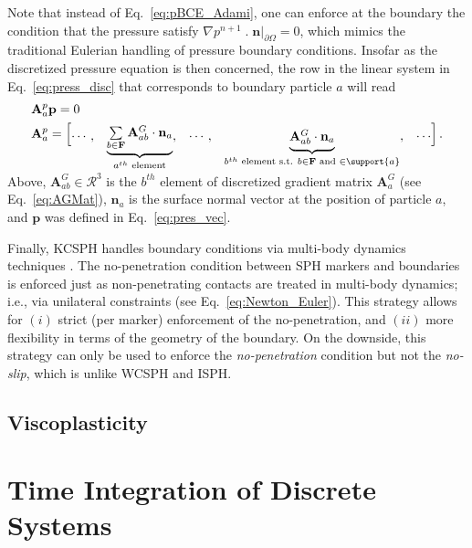 Note that instead of Eq.~\ref{eq:pBCE_Adami}, one can enforce at the boundary the condition that the pressure satisfy $\nabla p^{n+1}\;.\;\mathbf{n}|_{\partial \Omega}=0$, which mimics the traditional Eulerian handling of pressure boundary conditions. Insofar as the discretized pressure equation is then concerned, the row in the linear system in Eq.~\ref{eq:press_disc} that corresponds to boundary particle $a$ will read
\begin{align*}\renewcommand{\arraystretch}{1.2}
&\mathbf{A}^{p}_a \mathbf{p}=  0  \\
&\mathbf{A}^{p}_a= \begin{bmatrix}
\cdots, & 
\smash[b]{\underbrace{\begin{matrix}{\sum\limits_{b \in \mathbf{F}} \mathbf{A}^G_{ab} \cdot \mathbf{n}_a } \end{matrix}}_{a^{th}\text{ element}}} ,
&\cdots, &\smash[b]{\underbrace{\begin{matrix} \mathbf{A}^G_{ab} \cdot \mathbf{n}_a \end{matrix}}_{b^{th}\text{ element s.t. }{b \in \mathbf{F} \text{ and } \in \support{a}} }}, & \cdots
\end{bmatrix}.
\end{align*}\\
Above, $\mathbf{A}^G_{ab} \in \mathcal{R}^3$ is the $b^{th}$ element of discretized gradient matrix $\mathbf{A}^G_a$ (see Eq.~\ref{eq:AGMat}), $\mathbf{n}_a$ is the surface normal vector at the position of particle $a$, and $\mathbf{p}$ was defined in Eq.~\ref{eq:pres_vec}. 


Finally, KCSPH handles boundary conditions via multi-body dynamics techniques \cite{hammadConstrFluid2018}. The no-penetration condition between SPH markers and boundaries is enforced just as non-penetrating contacts are treated in multi-body dynamics; i.e., via unilateral constraints (see Eq.~\ref{eq:Newton_Euler}). This strategy allows for $(i)$ strict (per marker) enforcement of the no-penetration, and $(ii)$ more flexibility in terms of the geometry of the boundary. On the downside, this strategy can only be used to enforce the \textit{no-penetration} condition but not the \textit{no-slip}, which is unlike WCSPH and ISPH.

\subsection{Viscoplasticity}




\section{Time Integration of Discrete Systems}




